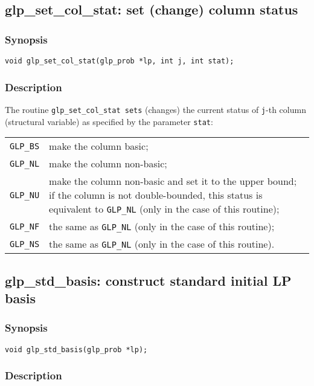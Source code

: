 \subsection{glp\_set\_col\_stat: set (change) column status}

\subsubsection*{Synopsis}

\begin{verbatim}
void glp_set_col_stat(glp_prob *lp, int j, int stat);
\end{verbatim}

\subsubsection*{Description}

The routine \verb|glp_set_col_stat sets| (changes) the current status
of \verb|j|-th column (structural variable) as specified by the
parameter \verb|stat|:

\begin{tabular}{@{}lp{104.2mm}@{}}
\verb|GLP_BS| & make the column basic; \\
\verb|GLP_NL| & make the column non-basic; \\
\verb|GLP_NU| & make the column non-basic and set it to the upper
   bound; if the column is not double-bounded, this status is equivalent
   to \verb|GLP_NL| (only in the case of this routine); \\
\verb|GLP_NF| & the same as \verb|GLP_NL| (only in the case of this
   routine); \\
\verb|GLP_NS| & the same as \verb|GLP_NL| (only in the case of this
   routine).
\end{tabular}

\subsection{glp\_std\_basis: construct standard initial LP basis}

\subsubsection*{Synopsis}

\begin{verbatim}
void glp_std_basis(glp_prob *lp);
\end{verbatim}

\subsubsection*{Description}

